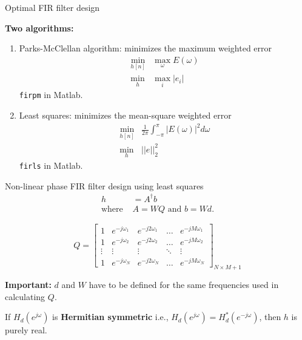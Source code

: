\documentclass[10pt]{beamer}
\begin{document}
%
\begin{frame}{Optimal FIR filter design}

\textbf{Two algorithms:}
\begin{enumerate}
	\item Parks-McClellan algorithm: minimizes the maximum weighted error 
	\begin{align*}
	\min_{h[n]} &\max_\omega E(\omega) \tag{min-max problem} \\
	\min_{h} &\max_i |e_i| \tag{in matrix notation}
	\end{align*}
	\texttt{firpm} in Matlab.
	\item Least squares: minimizes the mean-square weighted error 
	\begin{align*}
	\min_{h[n]} &\frac{1}{2\pi}\int_{-\pi}^{\pi} |E(\omega)|^2d\omega \tag{least squares}\\
	\min_{h} &||e||_2^2 \tag{in matrix notation}
	\end{align*}
	\texttt{firls} in Matlab.
\end{enumerate}
\end{frame}

%
\begin{frame}{Non-linear phase FIR filter design using least squares}
\begin{align*}
h &= A^{\dagger}b \tag{least-squares solution} \\
\text{where } & A = WQ \text{ and } b = Wd. 
\end{align*}

\begin{equation*}
Q = \begin{bmatrix}
1 & e^{-j\omega_1} & e^{-j2\omega_1} & \ldots & e^{-jM\omega_1} \\
1 & e^{-j\omega_2} & e^{-j2\omega_2} & \ldots & e^{-jM\omega_2} \\
\vdots & \vdots &  \vdots & \ddots & \vdots \\
1 & e^{-j\omega_N} & e^{-j2\omega_N} & \ldots & e^{-jM\omega_N}
\end{bmatrix}_{N\times M+1}
\end{equation*}

\textbf{Important:} $d$ and $W$ have to be defined for the same frequencies used in calculating $Q$.

If $H_d(e^{j\omega})$ is \textbf{Hermitian symmetric} i.e., $H_d(e^{j\omega}) = H_d^*(e^{-j\omega})$, then $h$ is purely real.
\end{frame}
\end{document}
